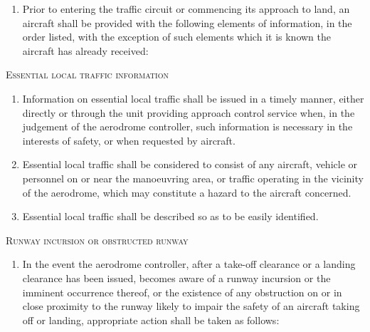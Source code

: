 \begin{enumeratesc}
\begin{enumerate}
        \item Prior to entering the traffic circuit or commencing its approach to land, an aircraft shall be provided with the following elements of information, in the order listed, with the exception of such elements which it is known the aircraft has already received:


    \end{enumerate}

    \item \textsc{Essential local traffic information}
    \begin{enumerate}
        \item Information on essential local traffic shall be issued in a timely manner, either directly or through the unit providing approach control service when, in the judgement of the aerodrome controller, such information is necessary in the interests of safety, or when requested by aircraft.
        \item Essential local traffic shall be considered to consist of any aircraft, vehicle or personnel on or near the manoeuvring area, or traffic operating in the vicinity of the aerodrome, which may constitute a hazard to the aircraft concerned.
        \item Essential local traffic shall be described so as to be easily identified.
    \end{enumerate}

    \item \textsc{Runway incursion or obstructed runway}
    \begin{enumerate}
        \item In the event the aerodrome controller, after a take-off clearance or a landing clearance has been issued, becomes aware of a runway incursion or the imminent occurrence thereof, or the existence of any obstruction on or in close proximity to the runway likely to impair the safety of an aircraft taking off or landing, appropriate action shall be taken as follows:


\end{enumerate}
\end{enumeratesc}
